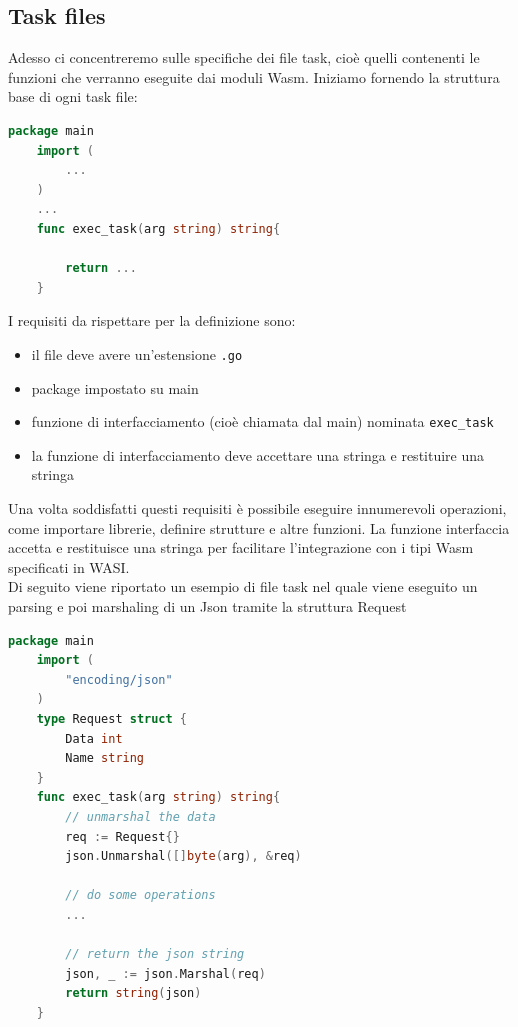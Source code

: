 \subsection{Task files}

Adesso ci concentreremo sulle specifiche dei file task, cioè quelli contenenti le funzioni che verranno eseguite dai moduli Wasm. Iniziamo fornendo la struttura base di ogni task file:
\begin{lstlisting}[language=Go, caption={Struttura base file task}, captionpos=b, label={code:task_file}]
    package main
    import (
    	...
    )
    ...    
    func exec_task(arg string) string{
    
    	return ... 
    }
\end{lstlisting}

I requisiti da rispettare per la definizione sono:
\begin{itemize}
    \item il file deve avere un'estensione \texttt{.go}
    \item package impostato su main
    \item funzione di interfacciamento (cioè chiamata dal main) nominata \texttt{exec\_task}
    \item la funzione di interfacciamento deve accettare una stringa e restituire una stringa
\end{itemize}

Una volta soddisfatti questi requisiti è possibile eseguire innumerevoli operazioni, come importare librerie, definire strutture e altre funzioni. La funzione interfaccia accetta e restituisce una stringa per facilitare l'integrazione con i tipi Wasm specificati in WASI.\\
Di seguito viene riportato un esempio di file task nel quale viene eseguito un parsing e poi marshaling di un Json tramite la struttura Request

\begin{lstlisting}[language=Go, caption={Task file ed integrazione con Json}, captionpos=b, label={code:task_file_json}, keepspaces=true]
    package main
    import (
        "encoding/json"
    )
    type Request struct {
        Data int
        Name string
    }
    func exec_task(arg string) string{
        // unmarshal the data
        req := Request{}
        json.Unmarshal([]byte(arg), &req)
    
        // do some operations
        ...
        
        // return the json string
        json, _ := json.Marshal(req)
        return string(json)
    }
\end{lstlisting}

